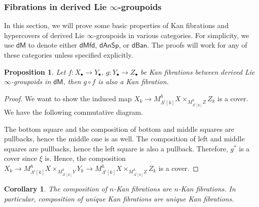 \documentclass[12pt]{amsart}
\newtheorem{cor}[thm]{Corollary}
\newtheorem{prop}[thm]{Proposition}
\theoremstyle{definition}
\theoremstyle{remark}
\numberwithin{equation}{section}
\newcommand{\1}{{\mathbb{1}}}
\newcommand{\dm}{\mathsf{dM}}
\newcommand{\dmfd}{\mathsf{dMfd}}
\newcommand{\dan}{\mathsf{dAnSp}}
\newcommand{\dban}{\mathsf{dBan}}
\begin{document}
\subsubsection{Fibrations in derived Lie $\infty$-groupoids}
In this section, we will prove some basic properties of Kan fibrations and hypercovers of derived Lie $\infty$-groupoids in various categories. For simplicity, we use $\dm$ to denote either $\dmfd$, $\dan$, or $\dban$. The proofs will work for any of these categories unless specified explicitly.
\begin{prop}
Let $f: X_{\bullet}\to Y_{\bullet}$, $g: Y_{\bullet}\to Z_{\bullet}$ be Kan fibrations between derived Lie $\infty$-groupoids in $\dm$, then $g\circ f $ is also a Kan fibration.\label{fib}
\end{prop}
\begin{proof}
    We want to show the induced map $X_{k}\to M^h_{\Lambda^i[k]} X\times_{M^h_{\Lambda^i[k]}Z} Z_k $ is a cover. We have the following commutative diagram.
    
    \begin{center}
    \end{center}
    
    The bottom square and the composition of bottom and middle squares are pullbacks, hence the middle one is as well. The composition of left and middle squares are pullbacks, hence the left square is also a pullback. Therefore, $g^*$ is a cover since $\xi$ is. Hence, the composition $X_k \to {M^h_{\Lambda^i[k]} X\times_{M^h_{\Lambda^i[k]}Y} Y_k} \to {M^h_{\Lambda^i[k]} X\times_{M^h_{\Lambda^i[k]}Z} Z_k}$ is a cover.
\end{proof}



\begin{cor}
    The composition of $n$-Kan fibrations are $n$-Kan fibrations. In particular, composition of unique Kan fibrations are unique Kan fibrations.
\end{cor}
\end{document}
